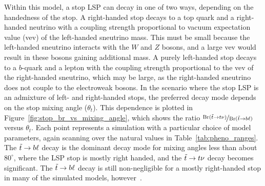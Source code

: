 Within this model, a stop LSP can decay in one of two ways, depending on
the handedness of the stop.
A right-handed stop decays to a top quark and a right-handed neutrino with a
coupling strength proportional to vacuum expectation value (vev) of the
left-handed sneutrino mass.
This must be small because the left-handed sneutrino interacts with the
$W$ and $Z$ bosons, and a large vev would result in these bosons gaining
additional mass.
A purely left-handed stop decays to a $b$-quark and a lepton with the coupling
strength proportional to the vev of the right-handed sneutrino, which may be
large, as the right-handed sneutrino does not couple to the electroweak bosons.
In the scenario where the stop LSP is an admixture of left- and right-handed
stops, the preferred decay mode depends on the stop mixing angle ($\theta_t$).
This dependence is plotted in Figure~\ref{fig:stop_br_vs_mixing_angle}, which
shows the ratio
$\nicefrac{\mathrm{Br}(\tilde{t} \rightarrow t\nu)}{\mathrm{Br}(\tilde{t} \rightarrow b\ell)}$
versus $\theta_t$.
Each point represents a simulation with a particular choice of model parameters,
again scanning over the natural values in Table~\ref{tab:pheno_ranges}.
The $\tilde{t} \rightarrow b\ell$ decay is the dominant decay mode for mixing angles less
than about $80^{\circ}$, where the LSP stop is mostly right handed, and the
$\tilde{t} \rightarrow t\nu$ decay becomes significant.
The $\tilde{t} \rightarrow b\ell$ decay is still non-negligible for a mostly right-handed
stop in many of the simulated models,
however~\cite{Marshall:2014cwa,Marshall:2014kea}.


